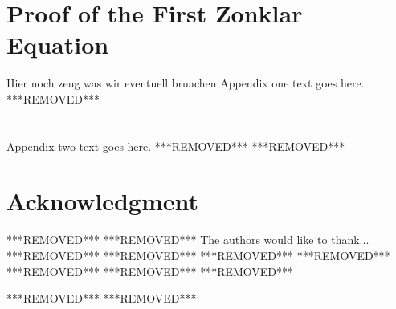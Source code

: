 \documentclass[10pt, journal, twocolumn]{IEEEtran}
\begin{document}
\section{Proof of the First Zonklar Equation}
Hier noch zeug was wir eventuell bruachen
Appendix one text goes here.
***REMOVED***
\section{}
Appendix two text goes here.
***REMOVED***
***REMOVED***
\section*{Acknowledgment}
***REMOVED***
***REMOVED***
The authors would like to thank...
***REMOVED***
***REMOVED***
\ifCLASSOPTIONcaptionsoff
  \newpage
\fi
***REMOVED***
***REMOVED***
***REMOVED***
***REMOVED***
***REMOVED***
%
%
%
***REMOVED***
% 
***REMOVED***
\end{document}
